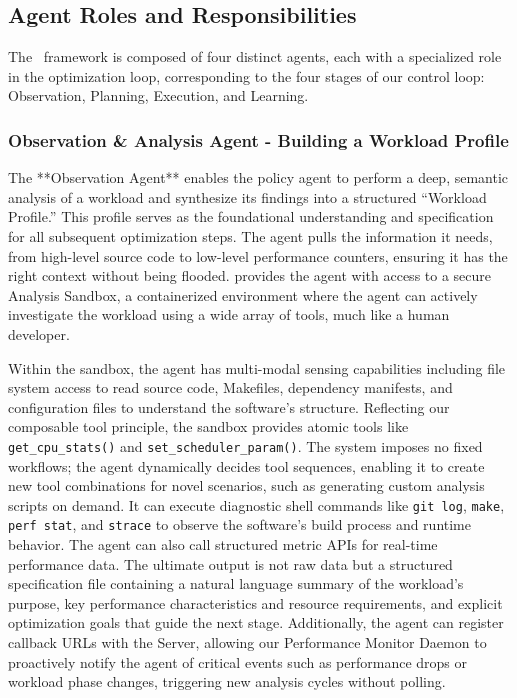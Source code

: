 \subsection{Agent Roles and Responsibilities}
The \agent\ framework is composed of four distinct agents, each with a specialized role in the optimization loop, corresponding to the four stages of our control loop: Observation, Planning, Execution, and Learning.

\subsubsection{Observation \& Analysis Agent - Building a Workload Profile}

The **Observation Agent** enables the policy agent to perform a deep, semantic analysis of a workload and synthesize its findings into a structured ``Workload Profile.'' This profile serves as the foundational understanding and specification for all subsequent optimization steps. The agent pulls the information it needs, from high-level source code to low-level performance counters, ensuring it has the right context without being flooded. \sys provides the agent with access to a secure Analysis Sandbox, a containerized environment where the agent can actively investigate the workload using a wide array of tools, much like a human developer.

Within the sandbox, the agent has multi-modal sensing capabilities including file system access to read source code, Makefiles, dependency manifests, and configuration files to understand the software's structure. Reflecting our composable tool principle, the sandbox provides atomic tools like \texttt{get\_cpu\_stats()} and \texttt{set\_scheduler\_param()}. The system imposes no fixed workflows; the agent dynamically decides tool sequences, enabling it to create new tool combinations for novel scenarios, such as generating custom analysis scripts on demand. It can execute diagnostic shell commands like \texttt{git log}, \texttt{make}, \texttt{perf stat}, and \texttt{strace} to observe the software's build process and runtime behavior. The agent can also call structured metric APIs for real-time performance data. The ultimate output is not raw data but a structured specification file containing a natural language summary of the workload's purpose, key performance characteristics and resource requirements, and explicit optimization goals that guide the next stage. Additionally, the agent can register callback URLs with the \sys Server, allowing our Performance Monitor Daemon to proactively notify the agent of critical events such as performance drops or workload phase changes, triggering new analysis cycles without polling.

